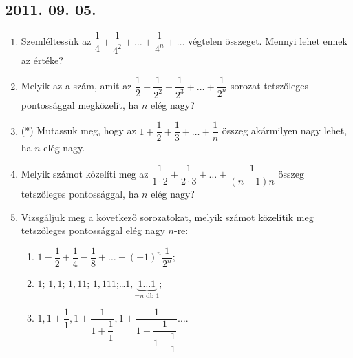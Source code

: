 \documentclass{article}
\newenvironment{abc}{\begin{enumerate}[label=\textit{\alph*})]}{\end{enumerate}}
\begin{document}
\subsection*{2011. 09. 05.}
\begin{enumerate}
\item Szemléltessük az
	$\dfrac{1}{4}+\dfrac{1}{4^2}+\ldots+\dfrac{1}{4^n}+\ldots$
	végtelen összeget. Mennyi lehet ennek az értéke?

\item Melyik az a szám, amit az
   $\dfrac{1}{2}+\dfrac{1}{2^2}+\dfrac{1}{2^3}+\ldots+\dfrac{1}{2^n}$
   sorozat tetszőleges pontossággal megközelít, ha $n$ elég nagy?

\item (*) Mutassuk meg, hogy az
	$1+\dfrac{1}{2}+\dfrac{1}{3}+\ldots+\dfrac{1}{n}$
	összeg akármilyen nagy lehet, ha $n$ elég nagy.

\item Melyik számot közelíti meg az
	$\dfrac{1}{1\cdot2}+\dfrac{1}{2\cdot3}+\ldots+\dfrac{1}{(n-1)n}$
   összeg tetszőleges pontossággal, ha $n$ elég nagy?

\item Vizsgáljuk meg a következő sorozatokat, melyik számot közelítik meg tetszőleges pontossággal elég nagy $n$-re:
	\begin{abc}
    \item $1-\dfrac{1}{2}+\dfrac{1}{4}-\dfrac{1}{8}+\ldots+(-1)^n\dfrac{1}{2^n}$;
    \item $1$; $1,1$; $1,11$; $1,111$;\ldots $1,\underbrace{1\ldots1}_{\text{=$n$ db $1$}}$;
    \item $1, 1+\dfrac{1}{1}, 1+\dfrac{1}{1+\dfrac{1}{1}}, 1+\dfrac{1}{1+\dfrac{1}{1+\dfrac{1}{1}}}\ldots$.
	\end{abc}
\end{enumerate}
\end{document}
